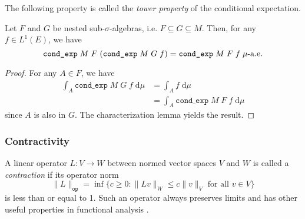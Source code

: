 The following property is called the \textit{tower property} of the conditional expectation.

\begin{lemma}
	Let $F$ and $G$ be nested sub-$\sigma$-algebras, i.e. $F \subseteq G \subseteq M$. Then, for any $f \in L^1(E)$, we have
	\[
		\normalfont \texttt{cond\_exp} \; M \; F \; (\texttt{cond\_exp} \; M \; G \; f) = \texttt{cond\_exp} \; M \; F \; f \; \mu\textrm{-a.e.}
	\]
\end{lemma}
\begin{proof}
	For any $A \in F$, we have
	\begin{align*}
		\int_A \texttt{cond\_exp} \; M \; G \; f \; \textrm{d} \mu &= \int_A f \; \textrm{d} \mu \\
		&= \int_A \texttt{cond\_exp} \; M \; F \; f \; \textrm{d} \mu
	\end{align*}
	since $A$ is also in $G$. The characterization lemma yields the result.
\end{proof}

\subsubsection{Contractivity}

A linear operator $L : V \rightarrow W$ between normed vector spaces $V$ and $W$ is called a \textit{contraction} if its operator norm
\[
	\lVert L \rVert_{\texttt{op}} = \inf\{ c \geq 0 : \lVert Lv \rVert_W \leq c \lVert v \rVert_V \textrm{ for all } v \in V \}
\]
is less than or equal to 1. Such an operator always preserves limits and has other useful properties in functional analysis \cite{sznagy2010}.

